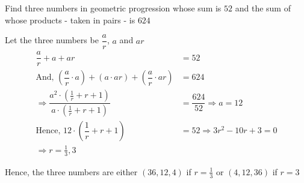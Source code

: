 
%
%
%
%
% 
% 

\question[3] Find three numbers in geometric progression whose sum is $52$ and the
sum of whose products - taken in pairs - is $624$


\ifprintanswers
\fi 

\begin{solution}[\halfpage]
	Let the three numbers be $\dfrac{a}{r}$, $a$ and $ar$
	\begin{align}
		\dfrac{a}{r} + a + ar &= 52 \\
		\text{And, } \left( \dfrac{a}{r}\cdot a\right) + \left( a\cdot ar\right) + 
		\left( \dfrac{a}{r}\cdot ar\right) &= 624 \\
		\Rightarrow \dfrac{a^2\cdot\left( \frac{1}{r} + r + 1 \right)}{a\cdot\left( \frac{1}{r} + r + 1\right)}
		&= \dfrac{624}{52} \Rightarrow a = 12 \\
		\text{Hence, } 12\cdot\left( \dfrac{1}{r} + r + 1 \right) &= 52 \Rightarrow 3r^2-10r + 3 = 0 \\
		\Rightarrow r = \frac{1}{3}, 3
	\end{align}
	
	Hence, the three numbers are either $(36,12,4)$ if $r=\frac{1}{3}$ or $(4,12,36)$ if $r=3$
\end{solution}

